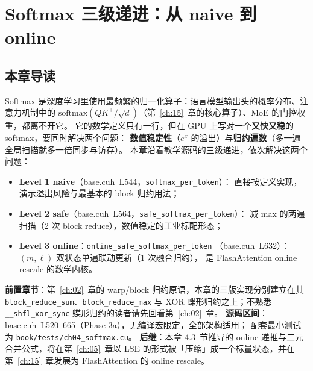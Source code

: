 \chapter{Softmax 三级递进：从 naive 到 online}\label{ch:04}

\section{本章导读}

Softmax 是深度学习里使用最频繁的归一化算子：语言模型输出头的概率分布、注意力机制中的
$\mathrm{softmax}(QK^{\top}/\sqrt{d})$（第~\ref{ch:15}~章的核心算子）、MoE 的门控权重，都离不开它。
它的数学定义只有一行，但在 GPU 上写对一个\textbf{又快又稳}的 softmax，要同时解决两个问题：
\textbf{数值稳定性}（$e^{x}$ 的溢出）与\textbf{归约遍数}（多一遍全局扫描就多一倍同步与访存）。
本章沿着教学源码的三级递进，依次解决这两个问题：

\begin{itemize}
  \item \textbf{Level 1 naive}（base.cuh~L544，\texttt{softmax\_\allowbreak{}per\_\allowbreak{}token}）：
        直接按定义实现，演示溢出风险与最基本的 block 归约用法；
  \item \textbf{Level 2 safe}（base.cuh~L564，\texttt{safe\_\allowbreak{}softmax\_\allowbreak{}per\_\allowbreak{}token}）：
        减 max 的两遍扫描（2 次 block reduce），数值稳定的工业标配形态；
  \item \textbf{Level 3 online}：\texttt{online\_\allowbreak{}safe\_\allowbreak{}softmax\_\allowbreak{}per\_\allowbreak{}token}
        （base.cuh~L632）：$(m,\ell)$ 双状态单遍联动更新（1 次融合归约），
        是 FlashAttention online rescale 的数学内核。
\end{itemize}

\textbf{前置章节}：第~\ref{ch:02}~章的 warp/block 归约原语，本章的三版实现分别建立在其
\texttt{block\_\allowbreak{}reduce\_\allowbreak{}sum}、\allowbreak\texttt{block\_\allowbreak{}reduce\_\allowbreak{}max} 与 XOR 蝶形归约之上；不熟悉
\texttt{\_\allowbreak{}\_\allowbreak{}shfl\_\allowbreak{}xor\_\allowbreak{}sync}
蝶形归约的读者请先回看第~\ref{ch:02}~章。
\textbf{源码区间}：base.cuh~L520--665（Phase 3a），无编译宏限定，全部架构适用；
配套最小测试为 \texttt{book/\allowbreak{}tests/\allowbreak{}ch04\_\allowbreak{}softmax.\allowbreak{}cu}。
\textbf{后继}：本章 4.3~节推导的 online 递推与二元合并公式，将在第~\ref{ch:05}~章以
LSE 的形式被「压缩」成一个标量状态，并在第~\ref{ch:15}~章发展为 FlashAttention 的
online rescale。

